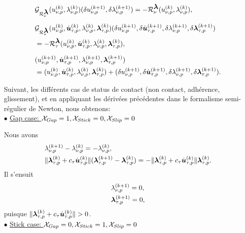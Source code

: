 \begin{align}
&{\cal G}_{{\cal R}_{\nu}^{\mbox{\boldmath{$\lambda$}}}}(u_{\nu, p}^{(k)},\lambda_{\nu, p}^{(k)})(\delta u_{\nu, p}^{(k+1)},\delta\lambda_{\nu, p}^{(k+1)})= - {\cal R}_{\nu}^{\mbox{\boldmath{$\lambda$}}} (u_{\nu, p}^{(k)},\lambda_{\nu, p}^{(k)}),\\[2mm]
&{\cal G}_{{\cal R}_{\tau}^{\mbox{\boldmath{$\lambda$}}}}(u_{\nu, p}^{(k)},\dot{\mbox{\boldmath{$u$}}}_{\tau, p}^{(k)},\lambda_{\nu, p}^{(k)},\mbox{\boldmath{$\lambda$}}_{\tau, p}^{(k)})(\delta u_{\nu, p}^{(k+1)},\delta\dot{\mbox{\boldmath{$u$}}}_{\tau, p}^{(k+1)},\delta\lambda_{\nu, p}^{(k+1)},\delta\mbox{\boldmath{$\lambda$}}_{\tau, p}^{(k+1)})\\
&= - {\cal R}_{\tau}^{\mbox{\boldmath{$\lambda$}}} (u_{\nu, p}^{(k)},\dot{\mbox{\boldmath{$u$}}}_{\tau, p}^{(k)},\lambda_{\nu, p}^{(k)},\mbox{\boldmath{$\lambda$}}_{\tau, p}^{(k)})\nonumber,\\[2mm]
& (u_{\nu, p}^{(k+1)},\dot{\mbox{\boldmath{$u$}}}_{\tau, p}^{(k+1)},\lambda_{\nu, p}^{(k+1)},\mbox{\boldmath{$\lambda$}}_{\tau, p}^{(k+1)})\\
& =(u_{\nu, p}^{(k)},\dot{\mbox{\boldmath{$u$}}}_{\tau, p}^{(k)},\lambda_{\nu, p}^{(k)},\mbox{\boldmath{$\lambda$}}_{\tau, p}^{(k)}) +(\delta u_{\nu, p}^{(k+1)},\delta\dot{\mbox{\boldmath{$u$}}}_{\tau, p}^{(k+1)},\delta\lambda_{\nu, p}^{(k+1)},\delta\mbox{\boldmath{$\lambda$}}_{\tau, p}^{(k+1)})\nonumber.
\end{align}

\noindent Suivant, les différents cas de status de contact (non contact, adhérence, glissement), et en appliquant les dérivées précédentes dans le formalisme semi-régulier de Newton, nous obtenons:\\

$\bullet$ \underline{Gap case: ${\cal X}_{Gap} =1, {\cal X}_{Stick} = 0, {\cal X}_{Slip} = 0$}

\noindent Nous avons
\begin{align}
&\lambda_{\nu, p}^{(k+1)}-\lambda_{\nu, p}^{(k)}=-\lambda_{\nu, p}^{(k)}, \\
& \|\mbox{\boldmath{$\lambda$}}_{\tau, p}^{(k)}+c_\tau \dot{\mbox{\boldmath{$u$}}}_{\tau, p}^{(k)}\| (\mbox{\boldmath{$\lambda$}}_{\tau, p}^{(k+1)}-\mbox{\boldmath{$\lambda$}}_{\tau, p}^{(k)}) = -\|\mbox{\boldmath{$\lambda$}}_{\tau, p}^{(k)}+c_\tau \dot{\mbox{\boldmath{$u$}}}_{\tau, p}^{(k)}\|\mbox{\boldmath{$\lambda$}}_{\tau, p}^{(k)}.
\end{align}
Il s'ensuit
\begin{align}
&\lambda_{\nu, p}^{(k+1)}=0, \\
&\mbox{\boldmath{$\lambda$}}_{\tau, p}^{(k+1)}=0,
\end{align}
puisque $\|\blambda_{\tau, p}^{(k)}+c_\tau \dot\bu_{\tau, p}^{(k)}\|>0$.\\

$\bullet$ \underline{Stick case: ${\cal X}_{Gap} =0, {\cal X}_{Stick} = 1, {\cal X}_{Slip} = 0$}

